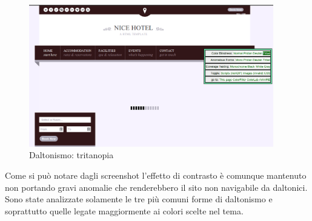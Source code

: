 \documentclass[a4paper,12pt,hidelinks]{report}
\begin{document}
\begin{figure}[h!]%
  \includegraphics[width=0.95\textwidth,keepaspectratio=true]{img/daltonismoTritanopia}
  \centering
  \caption{Daltonismo: tritanopia}%
  \label{fig:daltonismoTritanopia}%
\end{figure}
Come si può notare dagli screenshot l'effetto di contrasto è comunque mantenuto non portando gravi anomalie che renderebbero il sito non navigabile da daltonici. 
Sono state analizzate solamente le tre più comuni forme di daltonismo e soprattutto quelle legate maggiormente ai colori scelte nel tema.
\end{document}
